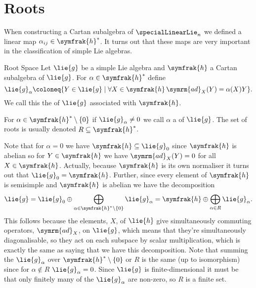 \documentclass[fleqn]{NotesClass}
\newcommand{\ad}{\symrm{ad}}
\newcommand{\csa}{\symfrak{h}}
\begin{document}
    \chapter{Roots}
    When constructing a Cartan subalgebra of \(\specialLinearLie_n\) we defined a linear map \(\alpha_{ij} \in \csa^*\).
    It turns out that these maps are very important in the classification of simple Lie algebras.
    
    \begin{dfn}{Root Space}{}
        Let \(\lie{g}\) be a simple Lie algebra and \(\csa\) a Cartan subalgebra of \(\lie{g}\).
        For \(\alpha \in \csa^*\) define
        \begin{equation}
            \lie{g}_\alpha \coloneq \{Y \in \lie{g} \mid \forall X \in \csa \, \ad_X(Y) = \alpha(X)Y\}.
        \end{equation}
        We call this the  of \(\lie{g}\) associated with \(\csa\).
        
        For \(\alpha \in \csa^*\setminus\{0\}\) if \(\lie{g}_{\alpha} \ne 0\) we call \(\alpha\) a  of \(\lie{g}\).
        The set of roots is usually denoted \(R \subseteq \csa^*\).
    \end{dfn}
    
    Note that for \(\alpha = 0\) we have \(\csa \subseteq \lie{g}_0\) since \(\csa\) is abelian so for \(Y \in \csa\) we have \(\ad_X(Y) = 0\) for all \(X \in \csa\).
    Actually, because \(\csa\) is its own normaliser it turns out that \(\lie{g}_0 = \csa\).
    Further, since every element of \(\csa\) is semisimple and \(\csa\) is abelian we have the decomposition
    \begin{equation}
        \lie{g} = \lie{g}_0 \oplus \bigoplus_{\alpha \in \csa^*\setminus\{0\}} \lie{g}_{\alpha} = \csa \oplus \bigoplus_{\alpha \in R} \lie{g}_\alpha.
    \end{equation}
    This follows because the elements, \(X\), of \(\lie{h}\) give simultaneously commuting operators, \(\ad_X\), on \(\lie{g}\), which means that they're simultaneously diagonalisable, so they act on each subspace by scalar multiplication, which is exactly the same as saying that we have this decomposition.
    Note that summing the \(\lie{g}_\alpha\) over \(\csa^*\setminus\{0\}\) or \(R\) is the same (up to isomorphism) since for \(\alpha \notin R\) \(\lie{g}_\alpha = 0\).
    Since \(\lie{g}\) is finite-dimensional it must be that only finitely many of the \(\lie{g}_\alpha\) are non-zero, so \(R\) is a finite set.
    
\end{document}
